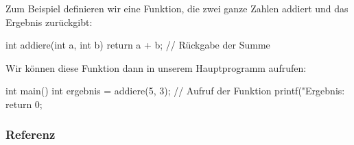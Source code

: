 Zum Beispiel definieren wir eine Funktion, die zwei ganze Zahlen addiert und das Ergebnis zurückgibt:
\begin{code}
int addiere(int a, int b) {
    return a + b; // Rückgabe der Summe
}
\end{code}
Wir können diese Funktion dann in unserem Hauptprogramm aufrufen:
\begin{code}
int main() {
    int ergebnis = addiere(5, 3); // Aufruf der Funktion
    printf("Ergebnis: %
    return 0;
}
\end{code}

\newpage
\subsubsection{Referenz}
\label{sec:referenz:kommandos}

